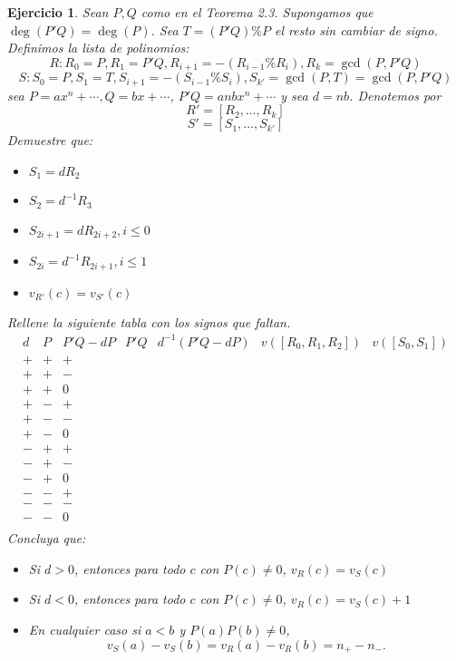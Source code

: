 \documentclass[10pt]{article}
\newtheorem{ejer}{Ejercicio}
\theoremstyle{definition}
\begin{document}
\begin{ejer} Sean $P,Q$ como en el Teorema 2.3. Supongamos que $\deg(P'Q)=\deg(P)$. Sea $T=(P'Q)\%P$ el resto sin cambiar de signo. Definimos la lista de polinomios:
\[R:R_0=P,R_1=P'Q,R_{i+1}=-(R_{i-1}\% R_i),R_k=\gcd(P,P'Q)\]
\[S:S_0=P,S_1=T,S_{i+1}=-(S_{i-1}\%S_i),S_{k'}=\gcd(P,T)=\gcd(P,P'Q)\]
sea $P=ax^n+\cdots, Q=bx+\cdots$, $P'Q=anbx^n+\cdots$ y sea $d=nb$. Denotemos por
\[R'=[R_2,\ldots, R_k]\]
\[S'=[S_1,\ldots,S_{k'}]\]
Demuestre que:
\begin{itemize}
    \item $S_1=dR_2$
    \item $S_2=d^{-1}R_3$
    \item $S_{2i+1}=dR_{2i+2},i\leq 0$
    \item $S_{2i}=d^{-1}R_{2i+1},i\leq 1$
    \item $v_{R'}(c)=v_{S'}(c)$
\end{itemize}
Rellene la siguiente tabla con los signos que faltan.
\[\begin{array}{c|c|c|c|c|c|c}
    d & P & P'Q-dP & P'Q & d^{-1}(P'Q-dP) & v([R_0,R_1,R_2]) & v([S_0,S_1])\\
    + & + & + & & & & \\
    + & + & - & & & & \\
    + & + & 0 & & & & \\
    + & - & + & & & & \\
    + & - & - & & & & \\
    + & - & 0 & & & & \\
    - & + & + & & & & \\
    - & + & - & & & & \\
    - & + & 0 & & & & \\
    - & - & + & & & & \\
    - & - & - & & & & \\
    - & - & 0 & & & & \\
\end{array}\]
Concluya que:
\begin{itemize}
    \item Si $d>0$, entonces para todo $c$ con $P(c)\neq 0$, $v_R(c)=v_S(c)$
    \item Si $d<0$, entonces para todo $c$ con $P(c)\neq 0$, $v_R(c)=v_S(c)+1$
    \item En cualquier caso si $a<b$ y $P(a)P(b)\neq 0$,
    \[v_S(a)-v_S(b)=v_R(a)-v_R(b)=n_{+}-n_{-}.\]
\end{itemize}
\end{ejer}
\end{document}
